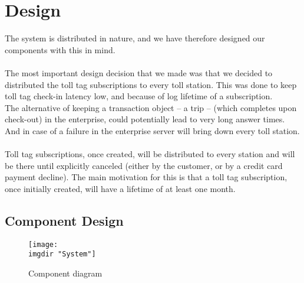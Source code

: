 \chapter{Design}
\noindent
The system is distributed in nature, and we have therefore designed our components with this in mind.\\\\
The most important design decision that we made was that we decided to distributed the toll tag subscriptions to every toll station. This was done to keep toll tag check-in latency low, and because of log lifetime of a subscription.\\
The alternative of keeping a transaction object -- a trip -- (which completes upon check-out) in the enterprise, could potentially lead to very long answer times. And in case of a failure in the enterprise server will bring down every toll station.\\\\
Toll tag subscriptions, once created, will be distributed to every station and will be there until explicitly canceled (either by the customer, or by a credit card payment decline). The main motivation for this is that a toll tag subscription, once initially created, will have a lifetime of at least one month.
\section{Component Design}

\begin{figure}
  \centering
  \texttt{[image: \\imgdir "System"]}
  \caption{Component diagram}
  \label{fig:component_diagram}
\end{figure}

